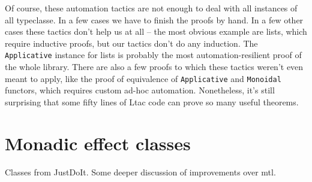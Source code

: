 \documentclass[declaration,inz,english,shortabstract]{iithesis}
\newcommand{\m}[1]{\texttt{#1}}
\begin{document}
Of course, these automation tactics are not enough to deal with all instances of all typeclasse. In a few cases we have to finish the proofs by hand. In a few other cases these tactics don't help us at all -- the most obvious example are lists, which require inductive proofs, but our tactics don't do any induction. The \m{Applicative} instance for lists is probably the most automation-resilient proof of the whole library. There are also a few proofs to which these tactics weren't even meant to apply, like the proof of equivalence of \m{Applicative} and \m{Monoidal} functors, which requires custom ad-hoc automation. Nonetheless, it's still surprising that some fifty lines of Ltac code can prove so many useful theorems.


\section{Monadic effect classes}

Classes from JustDoIt. Some deeper discussion of improvements over mtl.



\end{document}
